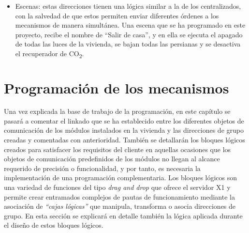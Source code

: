 \begin{itemize}
\item Escenas: estas direcciones tienen una lógica similar a la de los centralizados, con la salvedad de que estos permiten enviar diferentes órdenes a los mecanismos de manera simultánea. Una escena que se ha programado en este proyecto, recibe el nombre de “Salir de casa”, y en ella se ejecuta el apagado de todas las luces de la vivienda, se bajan todas las persianas y se desactiva el recuperador de CO\textsubscript{2}.
\end{itemize} 

\section{Programación de los mecanismos}

Una vez explicada la base de trabajo de la programación, en este capítulo se pasará a comentar el linkado que se ha establecido entre los diferentes objetos de comunicación de los módulos instalados en la vivienda y las direcciones de grupo creadas y comentadas con anterioridad. También se detallarán los bloques lógicos creados para satisfacer los requisitos del cliente en aquellas ocasiones que los objetos de comunicación predefinidos de los módulos no llegan al alcance requerido de precisión o funcionalidad, y por tanto, es necesaria la implementación de una programación complementaria. Los bloques lógicos son una variedad de funciones del tipo \textit {drag and drop} que ofrece el servidor X1 y permite crear entramados complejos de pautas de funcionamiento mediante la asociación de \textit {“cajas lógicas”} que manipula, transforma o asocia direcciones de grupo. En esta sección se explicará en detalle también la lógica aplicada durante el diseño de estos bloques lógicos.

